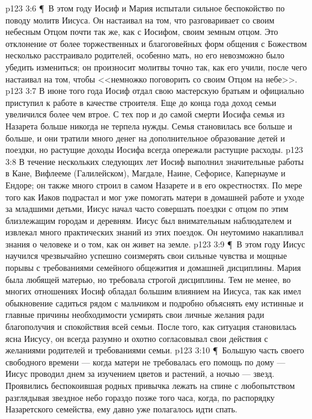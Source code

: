 \vs p123 3:6 \P\ В этом году Иосиф и Мария испытали сильное беспокойство по поводу молитв Иисуса. Он настаивал на том, что разговаривает со своим небесным Отцом почти так же, как с Иосифом, своим земным отцом. Это отклонение от более торжественных и благоговейных форм общения с Божеством несколько расстраивало родителей, особенно мать, но его невозможно было убедить измениться; он произносит молитвы точно так, как его учили, после чего настаивал на том, чтобы <<немножко поговорить со своим Отцом на небе>>.
\vs p123 3:7 В июне того года Иосиф отдал свою мастерскую братьям и официально приступил к работе в качестве строителя. Еще до конца года доход семьи увеличился более чем втрое. С тех пор и до самой смерти Иосифа семья из Назарета больше никогда не терпела нужды. Семья становилась все больше и больше, и они тратили много денег на дополнительное образование детей и поездки, но растущие доходы Иосифа всегда опережали растущие расходы.
\vs p123 3:8 В течение нескольких следующих лет Иосиф выполнил значительные работы в Кане, Вифлееме (Галилейском), Магдале, Наине, Сефорисе, Капернауме и Ендоре; он также много строил в самом Назарете и в его окрестностях. По мере того как Иаков подрастал и мог уже помогать матери в домашней работе и уходе за младшими детьми, Иисус начал часто совершать поездки с отцом по этим близлежащим городам и деревням. Иисус был внимательным наблюдателем и извлекал много практических знаний из этих поездок. Он неутомимо накапливал знания о человеке и о том, как он живет на земле.
\vs p123 3:9 \P\ В этом году Иисус научился чрезвычайно успешно соизмерять свои сильные чувства и мощные порывы с требованиями семейного общежития и домашней дисциплины. Мария была любящей матерью, но требовала строгой дисциплины. Тем не менее, во многих отношениях Иосиф обладал большим влиянием на Иисуса, так как имел обыкновение садиться рядом с мальчиком и подробно объяснять ему истинные и главные причины необходимости усмирять свои личные желания ради благополучия и спокойствия всей семьи. После того, как ситуация становилась ясна Иисусу, он всегда разумно и охотно согласовывал свои действия с желаниями родителей и требованиями семьи.
\vs p123 3:10 \P\ Большую часть своего свободного времени --- когда матери не требовалась его помощь по дому --- Иисус проводил днем за изучением цветов и растений, а ночью --- звезд. Проявились беспокоившая родных привычка лежать на спине с любопытством разглядывая звездное небо гораздо позже того часа, когда, по распорядку Назаретского семейства, ему давно уже полагалось идти спать.
